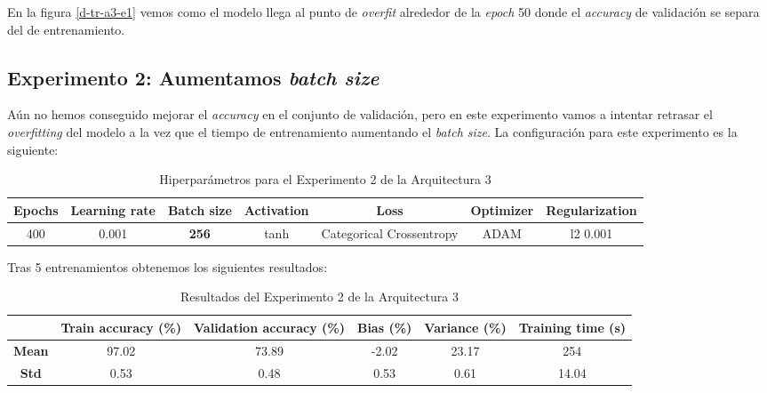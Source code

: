\documentclass{article}
\begin{document}
			En la figura \ref{d-tr-a3-e1} vemos como el modelo llega al punto de \textit{overfit} alrededor de la \textit{epoch} 50 donde el \textit{accuracy} de validaci\'on se separa del de entrenamiento.
			
		\subsection{Experimento 2: Aumentamos \textit{batch size}}
		\label{d-s-a3-e2}
			A\'un no hemos conseguido mejorar el \textit{accuracy} en el conjunto de validaci\'on, pero en este experimento vamos a intentar retrasar el \textit{overfitting} del modelo a la vez que el tiempo de entrenamiento aumentando el \textit{batch size}. La configuraci\'on para este experimento es la siguiente:
			\begin{table}[!h]
				\begin{tabular}{| c | c | c | c | c | c | c |}
					\textbf{Epochs} & \textbf{Learning rate} & \textbf{Batch size} & \textbf{Activation} & \textbf{Loss} & \textbf{Optimizer} & \textbf{Regularization} \\ \hline
					400 & 0.001 & \textbf{256} & tanh & Categorical Crossentropy & ADAM & l2 0.001
				\end{tabular}
				\caption{Hiperpar\'ametros para el Experimento 2 de la Arquitectura 3}
				\label{tab:hip-d-a3-e2}
			\end{table}
				
			Tras 5 entrenamientos obtenemos los siguientes resultados:
			\begin{table}[!h]
				\begin{center}
					\begin{tabular}{ c | c | c | c | c | c |}
						\ & \textbf{Train accuracy (\%)} & \textbf{Validation accuracy (\%)} & \textbf{Bias (\%)} & \textbf{Variance (\%)} & \textbf{Training time (s)} \\ \hline
						\textbf{Mean} & 97.02 & 73.89 & -2.02 & 23.17 & 254 \\ \hline
						\textbf{Std} & 0.53 & 0.48 & 0.53 & 0.61 & 14.04 \\ \hline
					\end{tabular}
					\caption{Resultados del Experimento 2 de la Arquitectura 3}
					\label{tab:res-d-a3-e2}
				\end{center}
			\end{table}
				
\end{document}
